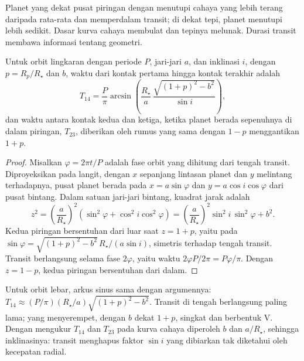 Planet yang dekat pusat piringan dengan  menutupi cahaya yang lebih terang
daripada rata-rata dan memperdalam transit; di dekat tepi, planet menutupi lebih sedikit. Dasar
kurva cahaya membulat dan tepinya melunak. Durasi
transit membawa informasi tentang geometri.

\begin{theorem}\label{thm:b3:exoplanets:duration}
Untuk orbit lingkaran dengan periode $P$, jari-jari $a$, dan inklinasi $i$, dengan
$p = R_p/R_\star$ dan  $b$, waktu dari kontak pertama
hingga kontak terakhir adalah
\[
T_{14} = \frac{P}{\pi}\arcsin\!\left(\frac{R_\star}{a}\,
          \frac{\sqrt{(1 + p)^2 - b^2}}{\sin i}\right),
\]
dan waktu antara kontak kedua dan ketiga, ketika planet berada
sepenuhnya di dalam piringan, $T_{23}$, diberikan oleh rumus yang sama dengan
$1 - p$ menggantikan $1 + p$.
\end{theorem}

\begin{proof}
Misalkan $\varphi = 2\pi t/P$ adalah fase orbit yang dihitung dari tengah transit.
Diproyeksikan pada langit, dengan $x$ sepanjang lintasan planet dan $y$ melintang terhadapnya,
pusat planet berada pada $x = a\sin\varphi$ dan $y = a\cos i\cos\varphi$
dari pusat bintang. Dalam satuan jari-jari bintang, kuadrat jarak adalah
\[
z^2 = \left(\frac{a}{R_\star}\right)^2(\sin^2\varphi + \cos^2 i\cos^2\varphi)
    = \left(\frac{a}{R_\star}\right)^2\sin^2 i\,\sin^2\varphi + b^2 .
\]
Kedua piringan bersentuhan dari luar saat $z = 1 + p$, yaitu pada
$\sin\varphi = \sqrt{(1 + p)^2 - b^2}\,R_\star/(a\sin i)$, simetris
terhadap tengah transit. Transit berlangsung selama fase $2\varphi$, yaitu
waktu $2\varphi P/2\pi = P\varphi/\pi$. Dengan $z = 1 - p$, kedua piringan bersentuhan
dari dalam.
\end{proof}

Untuk orbit lebar, arkus sinus sama dengan argumennya: $T_{14} \approx (P/\pi)
(R_\star/a)\sqrt{(1 + p)^2 - b^2}$. Transit di tengah berlangsung paling lama; yang
menyerempet, dengan $b$ dekat $1 + p$, singkat dan berbentuk V. Dengan mengukur
$T_{14}$ dan $T_{23}$ pada kurva cahaya diperoleh $b$ dan $a/R_\star$, sehingga
inklinasinya: transit menghapus faktor $\sin i$ yang
dibiarkan tak diketahui oleh kecepatan radial.

